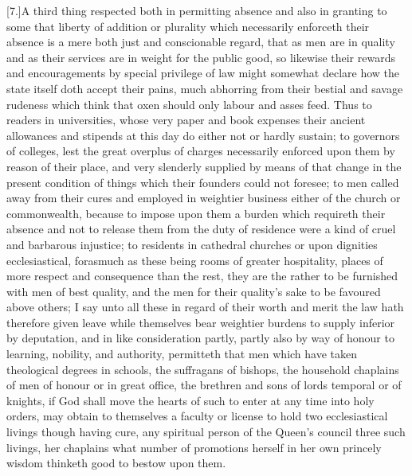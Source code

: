 [7.]A third thing respected both in permitting absence and also in granting to some that liberty of addition or plurality which necessarily enforceth their absence is a mere both just and conscionable regard, that as men are in quality and as their services are in weight for the public good, so likewise their rewards and encouragements by special privilege of law might somewhat declare how the state itself doth accept their pains, much abhorring from their bestial and savage rudeness which think that oxen should only labour and asses feed. Thus to readers in universities, whose very paper and book expenses their ancient allowances and stipends at this day do either not or hardly sustain; to governors of colleges, lest the great overplus of charges necessarily enforced upon them by reason of their place, and very slenderly supplied by means of that change in the present condition of things which their founders could not foresee; to men called away from their cures and employed in weightier business either of the church or commonwealth, because to impose upon them a burden which requireth their absence and not to release them from the duty of residence were a kind of cruel and barbarous injustice; to residents in cathedral churches or upon dignities ecclesiastical, forasmuch as these being rooms of greater hospitality, places of more respect and consequence than the rest, they are the rather to be furnished with men of best quality, and the men for their quality’s sake to be favoured above others; I say unto all these in regard of their worth and merit the law hath therefore given leave while themselves bear weightier burdens to supply inferior by deputation, and in like consideration partly, partly also by way of honour to learning, nobility, and authority, permitteth that men which have taken theological degrees in schools, the suffragans of bishops, the household chaplains of men of honour or in great office, the brethren and sons of lords temporal or of knights, if God shall move the hearts of such to enter at any time into holy orders, may obtain to themselves a faculty or license to hold two ecclesiastical livings though having cure, any spiritual person of the Queen’s council three such livings, her chaplains what number of promotions herself in her own princely wisdom thinketh good to bestow upon them.

